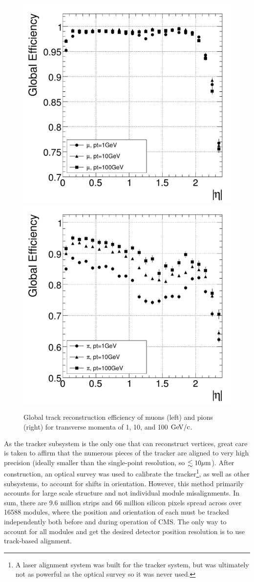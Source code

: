 \begin{figure}[htbp]
\begin{center}
\includegraphics[width=.45\linewidth]{Experiment/figures/MuonTrackEfficiency.pdf}
\includegraphics[width=.45\linewidth]{Experiment/figures/PionTrackEfficiency.pdf}
\caption[Global Track Reconstruction Efficiency at CMS]{Global track reconstruction efficiency of muons (left) and pions (right) for transverse momenta of 1, 10, and 100 $\rm{GeV}/c$.}
\label{fig:TrackEfficiency}
\end{center}
\end{figure}

As the tracker subsystem is the only one that can reconstruct vertices, great care is taken to affirm that the numerous pieces of the tracker are aligned to very high precision (ideally smaller than the single-point resolution, so $\lesssim10\mu\rm{m}$). After construction, an optical survey was used to calibrate the tracker\footnote{A laser alignment system was built for the tracker system, but was ultimately not as powerful as the optical survey so it was never used.}, as well as other subsystems, to account for shifts in orientation. However, this method primarily accounts for large scale structure and not individual module misalignments. In sum, there are 9.6 million strips and 66 million silicon pixels spread across over 16588 modules, where the position and orientation of each must be tracked independently both before and during operation of CMS. The only way to account for all modules and get the desired detector position resolution is to use track-based alignment.

